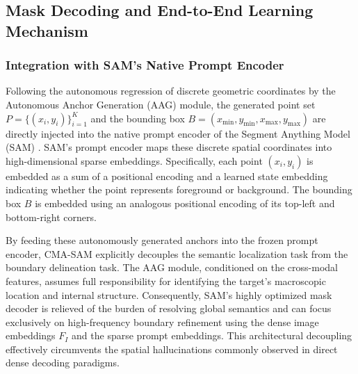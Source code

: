 \documentclass[onecolumn]{IEEEtran}
\numberwithin{equation}{section}
\theoremstyle{definition}
\theoremstyle{remark}
\begin{document}
\subsection{Mask Decoding and End-to-End Learning Mechanism}

\subsubsection{Integration with SAM's Native Prompt Encoder}
Following the autonomous regression of discrete geometric coordinates by the Autonomous Anchor Generation (AAG) module, the generated point set $P = \{(x_i, y_i)\}_{i=1}^K$ and the bounding box $B = (x_{\min}, y_{\min}, x_{\max}, y_{\max})$ are directly injected into the native prompt encoder of the Segment Anything Model (SAM) \cite{kirillov2023segment}. SAM's prompt encoder maps these discrete spatial coordinates into high-dimensional sparse embeddings. Specifically, each point $(x_i, y_i)$ is embedded as a sum of a positional encoding and a learned state embedding indicating whether the point represents foreground or background. The bounding box $B$ is embedded using an analogous positional encoding of its top-left and bottom-right corners.

By feeding these autonomously generated anchors into the frozen prompt encoder, CMA-SAM explicitly decouples the semantic localization task from the boundary delineation task. The AAG module, conditioned on the cross-modal features, assumes full responsibility for identifying the target's macroscopic location and internal structure. Consequently, SAM's highly optimized mask decoder is relieved of the burden of resolving global semantics and can focus exclusively on high-frequency boundary refinement using the dense image embeddings $F_I$ and the sparse prompt embeddings. This architectural decoupling effectively circumvents the spatial hallucinations commonly observed in direct dense decoding paradigms.
\end{document}
